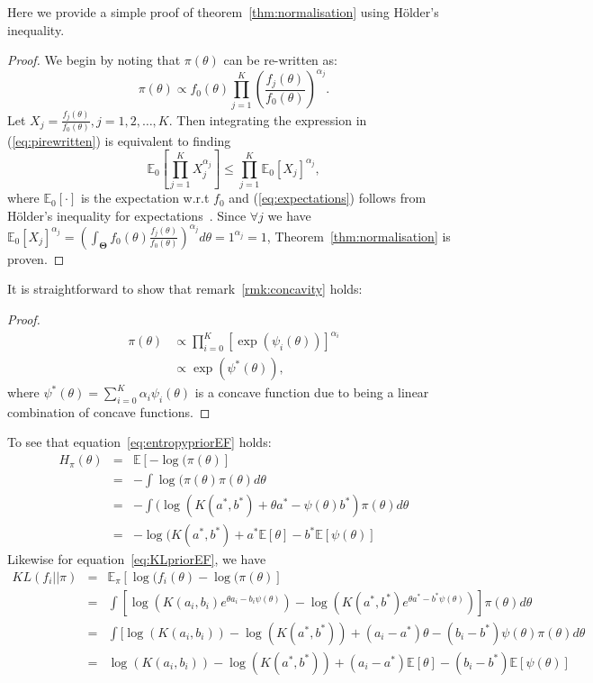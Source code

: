 \documentclass[a4paper, notitlepage, 10pt]{article}
\begin{document}
Here we provide a simple proof of theorem~\ref{thm:normalisation} using H\"{o}lder's inequality.
\begin{proof}
We begin by noting that $\pi(\theta)$ can be re-written as:
\begin{equation}
\label{eq:pirewritten}
 \pi(\theta) \propto f_0(\theta)\prod_{j=1}^{K} \left(\frac{f_j(\theta)}{f_0(\theta)}\right)^{\alpha_j}.
\end{equation}
Let $X_j = \frac{f_j(\theta)}{f_0(\theta)}, j=1, 2,\ldots, K$. 
Then integrating the expression in (\ref{eq:pirewritten}) is equivalent to finding 
\begin{equation}
\label{eq:expectations}
\mathbb{E}_{0}\left[\prod_{j=1}^KX_j^{\alpha_j}\right] \leq \prod_{j=1}^K \mathbb{E}_{0}[X_j]^{\alpha_j},
\end{equation}
where $\mathbb{E}_{0}[\cdot]$ is the expectation w.r.t $f_0$ and (\ref{eq:expectations}) follows from H\"{o}lder's inequality for expectations~\citep{yeh2011}.
Since $\forall j$ we have $\mathbb{E}_{0}[X_j]^{\alpha_j} = \left(\int_{\boldsymbol\Theta}f_0(\theta)\frac{f_j(\theta)}{f_0(\theta)}\right)^{\alpha_j}d\theta=1^{\alpha_j}=1$, Theorem~\ref{thm:normalisation} is proven.
\end{proof}
It is straightforward to show that remark~\ref{rmk:concavity} holds:
\begin{proof}
\begin{align}
 \pi(\theta) &\propto \prod_{i=0}^{K} [\exp(\psi_i(\theta))]^{\alpha_i}\\
             &\propto \exp(\psi^{\ast}(\theta)),
\end{align}
 where $\psi^{\ast}(\theta) = \sum_{i=0}^{K}\alpha_i\psi_i(\theta)$ is a concave function due to being a linear combination of concave functions.
\end{proof}
To see that equation~\ref{eq:entropypriorEF} holds:
\begin{eqnarray*} 
H_\pi(\theta) & = & \mathbb{E}[-\log(\pi(\theta)] \\
              & = & - \int \log(\pi(\theta) \pi(\theta) d\theta \\
              & = & - \int (\log(K(a^*, b^*) + \theta a^* - \psi(\theta) b^*) \pi(\theta) d\theta \\
              & = & - \log(K(a^*, b^*) + a^*  \mathbb{E}[\theta]-  b^*  \mathbb{E}[\psi(\theta)]
\end{eqnarray*}
Likewise for equation~\ref{eq:KLpriorEF}, we have 
\begin{eqnarray*} 
KL(f_i || \pi) & = & \mathbb{E}_\pi[\log(f_i(\theta)-\log(\pi(\theta)] \\
              & = & \int [\log( K(a_i,b_i) e^{\theta a_i - b_i \psi(\theta)}) - \log(K(a^*,b^*) e^{\theta a^* - b^* \psi(\theta)}) ] \pi(\theta) d\theta \\
              & = & \int [\log( K(a_i,b_i)) - \log(K(a^*,b^*)) + (a_i - a^*) \theta  - (b_i - b^*) \psi(\theta) \pi(\theta) d\theta \\
              & = & \log( K(a_i,b_i)) - \log(K(a^*,b^*)) + (a_i - a^*) \mathbb{E}[\theta] - (b_i - b^*) \mathbb{E}[\psi(\theta)] 
\end{eqnarray*}
\end{document}
